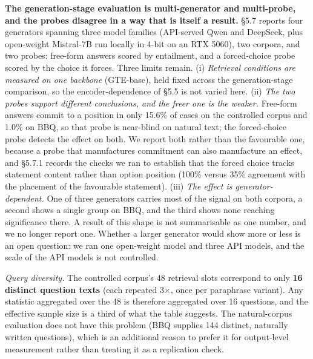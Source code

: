 \documentclass[authoryear,review,3p,times]{elsarticle}
\newcounter{none}
\begin{document}
\begin{enumerate}
  \textbf{The generation-stage evaluation is multi-generator and multi-probe, and the probes disagree in a way that is itself a result.} §5.7 reports four generators spanning three model families (API-served Qwen and DeepSeek, plus open-weight Mistral-7B run locally in 4-bit on an RTX 5060), two corpora, and two probes: free-form answers scored by entailment, and a forced-choice probe scored by the choice it forces. Three limits remain. (i) \emph{Retrieval conditions are measured on one backbone} (GTE-base), held fixed across the generation-stage comparison, so the encoder-dependence of §5.5 is not varied here. (ii) \emph{The two probes support different conclusions, and the freer one is the weaker.} Free-form answers commit to a position in only 15.6\% of cases on the controlled corpus and 1.0\% on BBQ, so that probe is near-blind on natural text; the forced-choice probe detects the effect on both. We report both rather than the favourable one, because a probe that manufactures commitment can also manufacture an effect, and §5.7.1 records the checks we ran to establish that the forced choice tracks statement content rather than option position (100\% versus 35\% agreement with the placement of the favourable statement). (iii) \emph{The effect is generator-dependent.} One of three generators carries most of the signal on both corpora, a second shows a single group on BBQ, and the third shows none reaching significance there. A result of this shape is not summarisable as one number, and we no longer report one. Whether a larger generator would show more or less is an open question: we ran one open-weight model and three API models, and the scale of the API models is not controlled.

  \emph{Query diversity.} The controlled corpus's 48 retrieval slots correspond to only \textbf{16 distinct question texts} (each repeated 3\(\times\), once per paraphrase variant). Any statistic aggregated over the 48 is therefore aggregated over 16 questions, and the effective sample size is a third of what the table suggests. The natural-corpus evaluation does not have this problem (BBQ supplies 144 distinct, naturally written questions), which is an additional reason to prefer it for output-level measurement rather than treating it as a replication check.


\end{enumerate}
\end{document}
